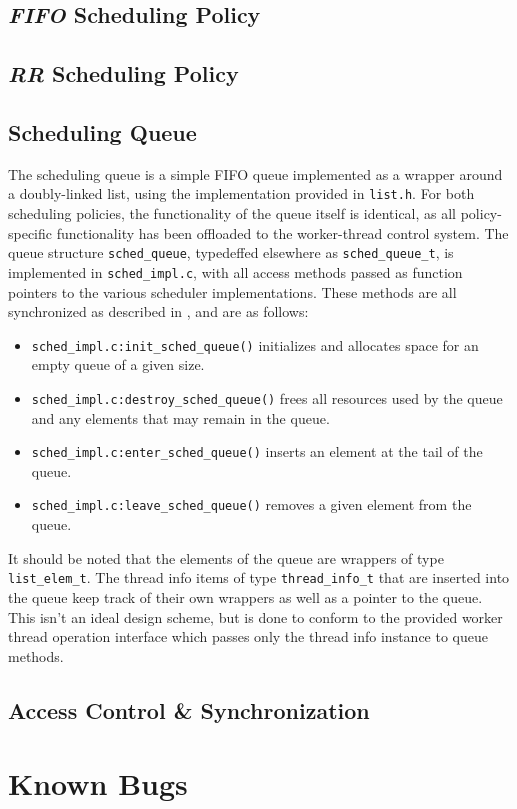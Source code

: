 \documentclass[paper=a4, fontsize=11pt]{scrartcl}
\begin{document}

\subsection*{\textit{FIFO} Scheduling Policy}

\subsection*{\textit{RR} Scheduling Policy}

\subsection*{Scheduling Queue}
The scheduling queue is a simple FIFO queue implemented as a wrapper around a doubly-linked list, using the implementation provided in \texttt{list.h}. For both scheduling policies, the functionality of the queue itself is identical, as all policy-specific functionality has been offloaded to the worker-thread control system. The queue structure \texttt{sched\_queue}, typedeffed elsewhere as \texttt{sched\_queue\_t}, is implemented in \texttt{sched\_impl.c}, with all access methods passed as function pointers to the various scheduler implementations. These methods are all synchronized as described in \textbf{}, and are as follows:

\begin{itemize}
  \item \texttt{sched\_impl.c:init\_sched\_queue()} initializes and allocates space for an empty queue of a given size.
  \item \texttt{sched\_impl.c:destroy\_sched\_queue()} frees all resources used by the queue and any elements that may remain in the queue.
  \item \texttt{sched\_impl.c:enter\_sched\_queue()} inserts an element at the tail of the queue.
  \item \texttt{sched\_impl.c:leave\_sched\_queue()} removes a given element from the queue.
\end{itemize}

It should be noted that the elements of the queue are wrappers of type \texttt{list\_elem\_t}. The thread info items of type \texttt{thread\_info\_t} that are inserted into the queue keep track of their own wrappers as well as a pointer to the queue. This isn't an ideal design scheme, but is done to conform to the provided worker thread operation interface which passes only the thread info instance to queue methods.

\subsection*{Access Control \& Synchronization}
\label{design:sync}

\section*{Known Bugs}
\end{document}

